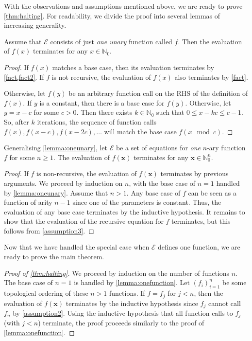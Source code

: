 \documentclass[a4paper,UKenglish,cleveref,autoref]{lipics-v2021}
\begin{document}
With the observations and assumptions mentioned above, we are ready to prove
\cref{thm:halting}. For readability, we divide the proof into several lemmas of
increasing generality.

\begin{lemma}\label{lemma:oneunary}
  Assume that $\mathcal{E}$ consists of just \emph{one unary} function called
  $f$. Then the evaluation of $f(x)$ terminates for any $x \in \mathbb{N}_{0}$.
\end{lemma}
\begin{proof}
  If $f(x)$ matches a base case, then its evaluation terminates by
  \cref{fact,fact2}. If $f$ is not recursive, the evaluation of $f(x)$ also
  terminates by \cref{fact}.

  Otherwise, let $f(y)$ be an arbitrary function call on the RHS of the
  definition of $f(x)$. If $y$ is a constant, then there is a base case for
  $f(y)$. Otherwise, let $y = x - c$ for some $c > 0$. Then there exists
  $k \in \mathbb{N}_{0}$ such that $0 \le x - kc \le c-1$. So, after $k$
  iterations, the sequence of function calls $f(x), f(x-c), f(x-2c),\dots$ will
  match the base case $f(x \mod c)$.
\end{proof}

\begin{lemma}\label{lemma:onefunction}
  Generalising \cref{lemma:oneunary}, let $\mathcal{E}$ be a set of equations
  for \emph{one} $n$-ary function $f$ for some $n \ge 1$. The evaluation of
  $f(\mathbf{x})$ terminates for any $\mathbf{x} \in \mathbb{N}_{0}^{n}$.
\end{lemma}
\begin{proof}
  If $f$ is non-recursive, the evaluation of $f(\mathbf{x})$ terminates by
  previous arguments. We proceed by induction on $n$, with the base case of
  $n=1$ handled by \cref{lemma:oneunary}. Assume that $n > 1$. Any base case of
  $f$ can be seen as a function of arity $n-1$ since one of the parameters is
  constant. Thus, the evaluation of any base case terminates by the inductive
  hypothesis. It remains to show that the evaluation of the recursive equation
  for $f$ terminates, but this follows from \cref{assumption3}.
\end{proof}

Now that we have handled the special case when $\mathcal{E}$ defines one
function, we are ready to prove the main theorem.

\begin{proof}[Proof of \cref{thm:halting}]
  We proceed by induction on the number of functions $n$. The base case of $n=1$
  is handled by \cref{lemma:onefunction}. Let ${(f_{i})}_{i=1}^{n}$ be some
  topological ordering of these $n > 1$ functions. If $f = f_{j}$ for $j < n$,
  then the evaluation of $f(\mathbf{x})$ terminates by the inductive hypothesis
  since $f_{j}$ cannot call $f_{n}$ by \cref{assumption2}. Using the inductive
  hypothesis that all function calls to $f_{j}$ (with $j < n$) terminate, the
  proof proceeds similarly to the proof of \cref{lemma:onefunction}.
\end{proof}
\end{document}
